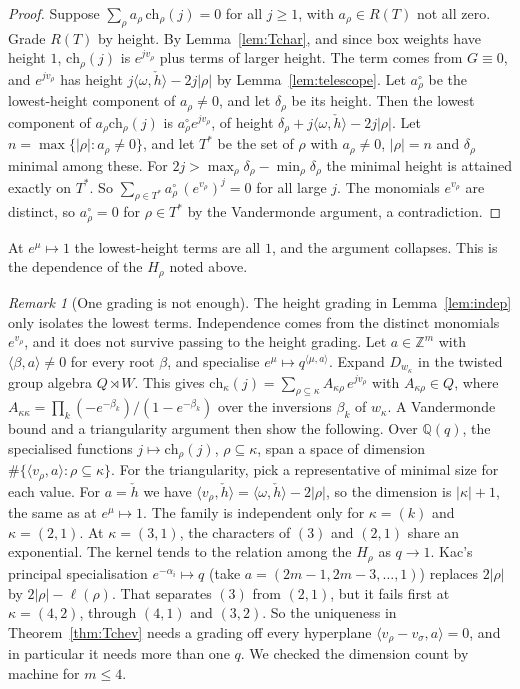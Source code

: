 \documentclass[11pt]{amsart}
\theoremstyle{definition}
\theoremstyle{remark}
\newtheorem{remark}[theorem]{Remark}
\newcommand{\Z}{\mathbb{Z}}
\begin{document}
\begin{proof}
Suppose $\sum_\rho a_\rho\,\mathrm{ch}_\rho(j)=0$ for all $j\ge1$, with $a_\rho\in R(T)$ not all zero. Grade
$R(T)$ by height. By Lemma~\ref{lem:Tchar}, and since box weights have height $1$,
$\mathrm{ch}_\rho(j)$ is $e^{jv_\rho}$ plus terms of larger height. The term comes from $G\equiv0$, and
$e^{jv_\rho}$ has height $j\langle\omega,\check h\rangle-2j|\rho|$ by Lemma~\ref{lem:telescope}. Let
$a_\rho^\circ$ be the lowest-height component of $a_\rho\ne0$, and let $\delta_\rho$ be its height. Then the
lowest component of $a_\rho\mathrm{ch}_\rho(j)$ is $a_\rho^\circ e^{jv_\rho}$, of height
$\delta_\rho+j\langle\omega,\check h\rangle-2j|\rho|$. Let $n=\max\{|\rho|:a_\rho\ne0\}$, and let
$T^*$ be the set of $\rho$ with $a_\rho\ne0$, $|\rho|=n$ and $\delta_\rho$ minimal among these. For
$2j>\max_\rho\delta_\rho-\min_\rho\delta_\rho$ the minimal height is attained exactly on $T^*$. So
$\sum_{\rho\in T^*}a^\circ_\rho\,(e^{v_\rho})^j=0$ for all large $j$. The monomials $e^{v_\rho}$ are
distinct, so $a^\circ_\rho=0$ for $\rho\in T^*$ by the Vandermonde argument, a contradiction.
\end{proof}

At $e^\mu\mapsto1$ the lowest-height terms are all $1$, and the argument collapses. This is the
dependence of the $H_\rho$ noted above.

\begin{remark}[One grading is not enough]\label{rem:onegrading}
The height grading in Lemma~\ref{lem:indep} only isolates the lowest terms. Independence comes from the distinct
monomials $e^{v_\rho}$, and it does not survive passing to the height grading. Let $a\in\Z^m$ with
$\langle\beta,a\rangle\ne0$ for every root $\beta$, and specialise $e^\mu\mapsto q^{\langle\mu,a\rangle}$. Expand
$D_{w_\kappa}$ in the twisted group algebra $Q\rtimes W$. This gives
$\mathrm{ch}_\kappa(j)=\sum_{\rho\subseteq\kappa}A_{\kappa\rho}\,e^{jv_\rho}$ with $A_{\kappa\rho}\in Q$, where
$A_{\kappa\kappa}=\prod_k(-e^{-\beta_k})/(1-e^{-\beta_k})$ over the inversions $\beta_k$ of $w_\kappa$. A Vandermonde
bound and a triangularity argument then show the following. Over $\mathbb Q(q)$, the specialised functions
$j\mapsto\mathrm{ch}_\rho(j)$, $\rho\subseteq\kappa$, span a space of dimension
$\#\{\langle v_\rho,a\rangle:\rho\subseteq\kappa\}$. For the triangularity, pick a representative of minimal size for
each value. For $a=\check h$ we have $\langle v_\rho,\check h\rangle=\langle\omega,\check h\rangle-2|\rho|$, so the
dimension is $|\kappa|+1$, the same as at $e^\mu\mapsto1$. The family is independent only for $\kappa=(k)$ and
$\kappa=(2,1)$. At $\kappa=(3,1)$, the characters of $(3)$ and $(2,1)$ share an exponential. The kernel tends to the
relation among the $H_\rho$ as $q\to1$. Kac's principal specialisation $e^{-\alpha_i}\mapsto q$ (take $a=(2m-1,2m-3,\dots,1)$)
replaces $2|\rho|$ by $2|\rho|-\ell(\rho)$. That separates $(3)$ from $(2,1)$, but it fails first at $\kappa=(4,2)$,
through $(4,1)$ and $(3,2)$. So the uniqueness in Theorem~\ref{thm:Tchev} needs a grading off every hyperplane
$\langle v_\rho-v_\sigma,a\rangle=0$, and in particular it needs more than one $q$. We checked the dimension count by
machine for $m\le4$.
\end{remark}
\end{document}

